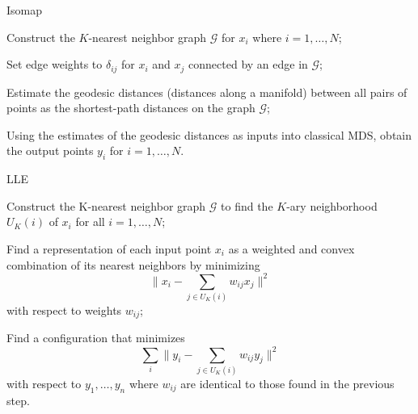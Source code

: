 \documentclass[11pt,a4paper,]{article}
\begin{document}
\begin{algorithm}[!htb]
  \caption{Isomap}
  \label{alg:isomap}
  \DontPrintSemicolon
  \SetAlgoLined
  \BlankLine

  Construct the $K$-nearest neighbor graph $\mathcal{G}$ for $x_i$ where $i=1,\ldots,N$;

  Set edge weights to $\delta_{ij}$ for $x_i$ and $x_j$ connected by an edge in $\mathcal{G}$;

  Estimate the geodesic distances (distances along a manifold) between all pairs of points as the shortest-path distances on the graph $\mathcal{G}$;

  Using the estimates of the geodesic distances as inputs into classical MDS, obtain the output points $y_i$ for $i=1,\ldots,N$.

\end{algorithm}


\begin{algorithm}[!htb]
  \caption{LLE}
  \label{alg:lle}
  \DontPrintSemicolon
  \SetAlgoLined
  \BlankLine

  Construct the K-nearest neighbor graph $\mathcal{G}$ to find the $K$-ary neighborhood $U_K(i)$ of $x_i$ for all $i=1,\ldots,N$;

  Find a representation of each input point $x_i$ as a weighted and convex combination of its nearest neighbors by minimizing
  $$
    \bigg\|x_{i}-\sum_{j \in U_K(i)} w_{i j} x_{j}\bigg\|^{2}
  $$
  with respect to weights $w_{ij}$;

  Find a configuration that minimizes
  $$
    \sum_{i}\bigg\|y_{i}-\sum_{j \in U_K(i)} w_{i j} y_{j}\bigg\|^{2}
  $$
  with respect to $y_{1}, \dots, y_{n}$ where $w_{ij}$ are identical to those found in the previous step.

\end{algorithm}
\end{document}
